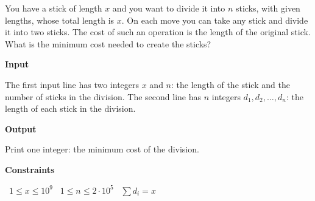 You have a stick of length $x$ and you want to divide it into $n$ sticks, with given lengths, whose total length is $x$.
On each move you can take any stick and divide it into two sticks. The cost of such an operation is the length of the original stick.
What is the minimum cost needed to create the sticks?

\vspace{0.3cm}\noindent\textbf{Input}

The first input line has two integers $x$ and $n$: the length of the stick and the number of sticks in the division.
The second line has $n$ integers $d_1,d_2,\ldots,d_n$: the length of each stick in the division.

\vspace{0.3cm}\noindent\textbf{Output}

Print one integer: the minimum cost of the division.

\vspace{0.3cm}\noindent\textbf{Constraints}

\textbullet\ $1 \le x \le 10^9$
\textbullet\ $1 \le n \le 2 \cdot 10^5$
\textbullet\ $\sum d_i = x$